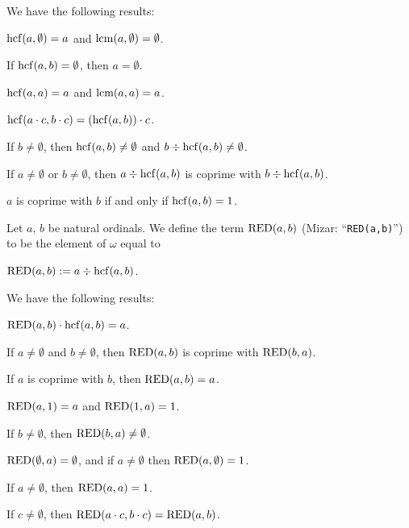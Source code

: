\documentclass{article}
\begin{document}
We have the following results:
\begin{thm}
\item\label{arytm3:14} $\operatorname{hcf}(a,\emptyset)=a$ and $\operatorname{lcm}(a,\emptyset)=\emptyset$.
\item\label{arytm3:15} If $\operatorname{hcf}(a,b)=\emptyset$, then $a=\emptyset$.
\item\label{arytm3:16} $\operatorname{hcf}(a,a)=a$ and $\operatorname{lcm}(a,a)=a$.
\item\label{arytm3:17} $\operatorname{hcf}(a\cdot c,b\cdot c)=(\operatorname{hcf}(a,b))\cdot c$.
\item\label{arytm3:18} If $b\neq\emptyset$, then
  $\operatorname{hcf}(a,b)\neq\emptyset$ and $b\div\operatorname{hcf}(a,b)\neq\emptyset$.
\item\label{arytm3:19} If $a\neq\emptyset$ or $b\neq\emptyset$, then
  $a\div\operatorname{hcf}(a,b)$ is coprime with $b\div\operatorname{hcf}(a,b)$.
\item\label{arytm3:20} $a$ is coprime with $b$ if and only if $\operatorname{hcf}(a,b)=1$.
\end{thm}

\begin{definition}
Let $a$, $b$ be natural ordinals.
We define the term $\operatorname{RED}(a,b)$ (Mizar: ``\verb#RED(a,b)#'') to be the
element of $\omega$ equal to
\begin{defn}
\item $\operatorname{RED}(a,b) := a\div\operatorname{hcf}(a,b)$.
\end{defn}
\end{definition}

We have the following results:
\begin{thm}
\item\label{arytm3:21} $\operatorname{RED}(a,b)\cdot\operatorname{hcf}(a,b)=a$.
\item\label{arytm3:22} If $a\neq\emptyset$ and $b\neq\emptyset$, then
  $\operatorname{RED}(a,b)$ is coprime with $\operatorname{RED}(b,a)$.
\item\label{arytm3:23} If $a$ is coprime with $b$, then $\operatorname{RED}(a,b)=a$.
\item\label{arytm3:24} $\operatorname{RED}(a,1)=a$ and $\operatorname{RED}(1,a)=1$.
\item\label{arytm3:25} If $b\neq\emptyset$, then $\operatorname{RED}(b,a)\neq\emptyset$.
\item\label{arytm3:26} $\operatorname{RED}(\emptyset,a)=\emptyset$, and if $a\neq\emptyset$
  then $\operatorname{RED}(a,\emptyset)=1$.
\item\label{arytm3:27} If $a\neq\emptyset$, then $\operatorname{RED}(a,a)=1$.
\item\label{arytm3:28} If $c\neq\emptyset$, then $\operatorname{RED}(a\cdot c,b\cdot c)=\operatorname{RED}(a,b)$.
\end{thm}
\end{document}
